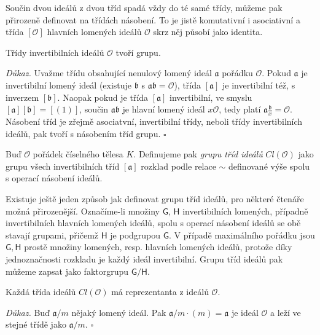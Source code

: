 \documentclass[12pt]{report}
\begin{document}
Součin dvou ideálů z dvou tříd spadá vždy do té samé třídy, můžeme pak přirozeně definovat na třídách násobení. To je jistě komutativní i asociativní a třída $[\mathcal{O}]$ hlavních lomených ideálů $\mathcal{O}$ skrz něj působí jako identita.

\begin{veta}
Třídy invertibilních ideálů $\mathcal{O}$ tvoří grupu.
\end{veta}
\noindent \textit{Důkaz.} Uvažme třídu obsahující nenulový lomený ideál $\mathfrak{a}$ pořádku $\mathcal{O}$. Pokud $\mathfrak{a}$ je invertibilní lomený ideál (existuje $\mathfrak{b}$ s $\mathfrak{ab} = \mathcal{O}$), třída $[\mathfrak{a}]$ je invertibilní též, s inverzem $[\mathfrak{b}]$. Naopak pokud je třída $[\mathfrak{a}]$ invertibilní, ve smyslu $[\mathfrak{a}][\mathfrak{b}] = [(1)]$, součin $\mathfrak{a}\mathfrak{b}$ je hlavní lomený ideál $x\mathcal{O}$, tedy platí $\mathfrak{a} \frac{\mathfrak{b}}{x} = \mathcal{O}$. Násobení tříd je zřejmě asociatvní, invertibilní třídy, neboli třídy invertibilních ideálů, pak tvoří s násobením tříd grupu. \hfill $\square$\\

\begin{definice}
Buď $\mathcal{O}$ pořádek číselného tělesa $K$. Definujeme pak \textit{grupu tříd ideálů} $Cl(\mathcal{O})$ jako grupu všech invertibilních tříd $[\mathfrak{a}]$ rozklad podle relace $\sim$ definované výše spolu s operací násobení ideálů.
\end{definice}

Existuje ještě jeden způsob jak definovat grupu tříd ideálů, pro některé čtenáře možná přirozenější. Označíme-li množiny $\mathsf{G}$, $\mathsf{H}$ invertibilních lomených, případně invertibilních hlavních lomených ideálů, spolu s operací násobení ideálů se obě stavají grupami, přičemž $\mathsf{H}$ je podgrupou $\mathsf{G}$. V případě maximálního pořádku jsou $\mathsf{G},\mathsf{H}$ prostě množiny lomených, resp. hlavních lomených ideálů, protože díky jednoznačnosti rozkladu je každý ideál invertibilní. Grupu tříd ideálů pak můžeme zapsat jako faktorgrupu $\mathsf{G}/\mathsf{H}$.

\begin{veta}
Každá třída ideálů $Cl (\mathcal{O})$ má reprezentanta z ideálů $\mathcal{O}$.
\end{veta}
\noindent \textit{Důkaz.} Buď $\mathfrak{a}/m$ nějaký lomený ideál. Pak $\mathfrak{a}/m \cdot (m) = \mathfrak{a}$ je ideál $\mathcal{O}$ a leží ve stejné třídě jako $\mathfrak{a}/m$. \hfill $\square$\\
\end{document}
